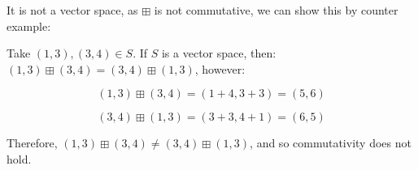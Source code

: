 \documentclass[12pt]{article} %
\begin{document}
\begin{homeworkProblem}


    It is not a vector space, as $\boxplus$ is not commutative, we can show this by counter example:

    Take $(1, 3), (3, 4) \in S$. If $S$ is a vector space, then: $(1, 3) \boxplus (3, 4) = (3, 4) \boxplus (1, 3)$, however:

    $$
        (1, 3) \boxplus (3, 4) = (1 + 4, 3 + 3) = (5, 6)
    $$

    $$
        (3, 4) \boxplus (1, 3) = (3 + 3, 4 + 1) = (6, 5)
    $$

    Therefore, $(1, 3) \boxplus (3, 4) \not = (3, 4) \boxplus (1, 3)$, and so commutativity does not hold.

\end{homeworkProblem}
\pagebreak
\end{document}

